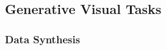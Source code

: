 \documentclass{article}
\begin{document}
\begin{multicols}{2}
\subsection{ Generative Visual Tasks}
\subsubsection{ Data Synthesis}




\end{multicols}
\end{document}
